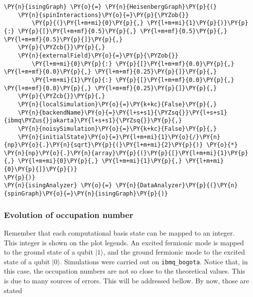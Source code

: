     \begin{tcolorbox}[breakable, size=fbox, boxrule=1pt, pad at break*=1mm,colback=cellbackground, colframe=cellborder]
\begin{Verbatim}[commandchars=\\\{\}]
\PY{n}{isingGraph} \PY{o}{=} \PY{n}{HeisenbergGraph}\PY{p}{(}
    \PY{n}{spinInteractions}\PY{o}{=}\PY{p}{\PYZob{}}
        \PY{p}{(}\PY{l+m+mi}{0}\PY{p}{,} \PY{l+m+mi}{1}\PY{p}{)}\PY{p}{:} \PY{p}{[}\PY{l+m+mf}{0.5}\PY{p}{,} \PY{l+m+mf}{0.5}\PY{p}{,} \PY{l+m+mf}{0.5}\PY{p}{]}\PY{p}{,}
    \PY{p}{\PYZcb{}}\PY{p}{,}
    \PY{n}{externalField}\PY{o}{=}\PY{p}{\PYZob{}}
        \PY{l+m+mi}{0}\PY{p}{:} \PY{p}{[}\PY{l+m+mf}{0.0}\PY{p}{,} \PY{l+m+mf}{0.0}\PY{p}{,} \PY{l+m+mf}{0.25}\PY{p}{]}\PY{p}{,}
        \PY{l+m+mi}{1}\PY{p}{:} \PY{p}{[}\PY{l+m+mf}{0.0}\PY{p}{,} \PY{l+m+mf}{0.0}\PY{p}{,} \PY{l+m+mf}{0.25}\PY{p}{]}\PY{p}{,}
    \PY{p}{\PYZcb{}}\PY{p}{,}
    \PY{n}{localSimulation}\PY{o}{=}\PY{k+kc}{False}\PY{p}{,}
    \PY{n}{backendName}\PY{o}{=}\PY{l+s+s1}{\PYZsq{}}\PY{l+s+s1}{ibmq\PYZus{}jakarta}\PY{l+s+s1}{\PYZsq{}}\PY{p}{,}
    \PY{n}{noisySimulation}\PY{o}{=}\PY{k+kc}{False}\PY{p}{,}
    \PY{n}{initialState}\PY{o}{=}\PY{l+m+mi}{1}\PY{o}{/}\PY{n}{np}\PY{o}{.}\PY{n}{sqrt}\PY{p}{(}\PY{l+m+mi}{2}\PY{p}{)} \PY{o}{*} \PY{n}{np}\PY{o}{.}\PY{n}{array}\PY{p}{(}\PY{p}{[}\PY{l+m+mi}{1}\PY{p}{,} \PY{l+m+mi}{0}\PY{p}{,} \PY{l+m+mi}{1}\PY{p}{,} \PY{l+m+mi}{0}\PY{p}{]}\PY{p}{)}
\PY{p}{)}
\PY{n}{isingAnalyzer} \PY{o}{=} \PY{n}{DataAnalyzer}\PY{p}{(}\PY{n}{spinGraph}\PY{o}{=}\PY{n}{isingGraph}\PY{p}{)}
\end{Verbatim}
\end{tcolorbox}

    \hypertarget{evolution-of-occupation-number}{%
\subsubsection{Evolution of occupation
number}\label{evolution-of-occupation-number}}

Remember that each computational basis state can be mapped to an
integer. This integer is shown on the plot legends. An excited fermionic
mode is mapped to the ground state of a qubit \(|1\rangle\), and the
ground fermionic mode to the excited state of a qubit \(|0\rangle\).
Simulations were carried out on \texttt{ibmq\_bogota}. Notice that, in
this case, the occupation numbers are not so close to the theoretical
values. This is due to many sources of errors. This will be addressed
bellow. By now, those are stated

